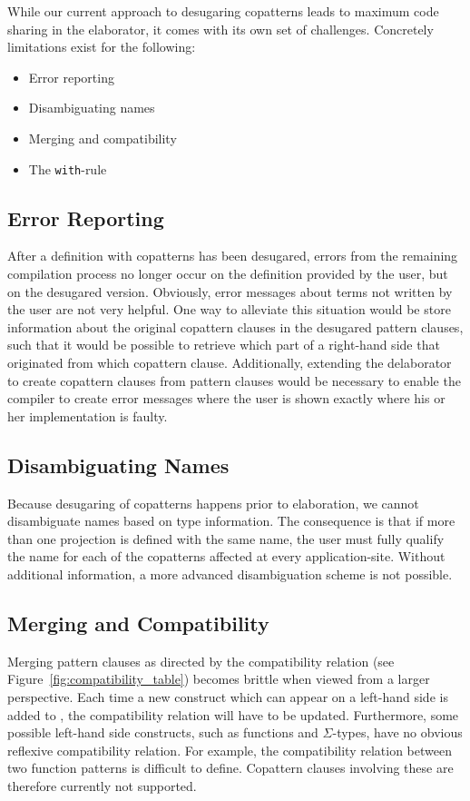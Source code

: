 While our current approach to desugaring copatterns leads to maximum code
sharing in the elaborator, it comes with its own set of challenges. Concretely
limitations exist for the following:

\begin{itemize}
\item Error reporting
\item Disambiguating names
\item Merging and compatibility
\item The \texttt{with}-rule
\end{itemize}

\subsection{Error Reporting}
After a definition with copatterns has been desugared, errors from the remaining
compilation process no longer occur on the definition provided by the user, but on the desugared version. Obviously,
error messages about terms not written by the user are not very helpful. One way
to alleviate this situation would be store information about the original
copattern clauses in the desugared pattern clauses, such that it would be possible to
retrieve which part of a right-hand side that originated from which copattern
clause. Additionally, extending the delaborator  to create copattern clauses from
pattern clauses would be necessary to enable the compiler to create error
messages where the user is shown exactly where his or her implementation is faulty.

\subsection{Disambiguating Names}
Because desugaring of copatterns happens prior to elaboration, we cannot
disambiguate names based on type information. The consequence is that if more
than one projection is defined with the same name, the user must fully qualify
the name for each of the copatterns affected at every application-site. Without
additional information, a more advanced disambiguation scheme is not possible.

\subsection{Merging and Compatibility}
\label{sec:merg-comp}
Merging pattern clauses as directed by the compatibility relation (see
Figure~\ref{fig:compatibility_table}) becomes brittle when viewed from a larger
perspective. Each time a new construct which can appear on a left-hand side is
added to \IdrisM{}, the compatibility relation will have to be
updated. Furthermore, some possible left-hand side constructs, such as functions
and $\Sigma$-types, have no obvious reflexive compatibility relation. For
example, the compatibility relation between two function patterns is difficult to
define. Copattern clauses involving these are therefore currently not supported.

